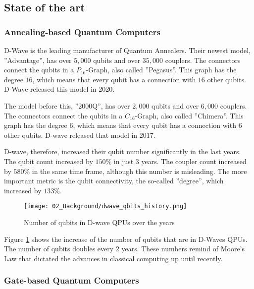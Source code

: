 


\subsection{State of the art}

\subsubsection{Annealing-based Quantum Computers}

D-Wave is the leading manufacturer of Quantum Annealers.
Their newest model, ''Advantage'', has over $5, 000$ qubits and over $35, 000$ couplers.
The connectors connect the qubits in a $P_{16}$-Graph, also called ''Pegasus''.
This graph has the degree $16$, which means that every qubit has a connection with $16$ other qubits.
D-Wave released this model in 2020.
\cite{D-Wave2020, Zbinden2020}

The model before this, ''2000Q'', has over $2, 000$ qubits and over $6, 000$ couplers.
The connectors connect the qubits in a $C_{16}$-Graph, also called ''Chimera''.
This graph has the degree $6$, which means that every qubit has a connection with $6$ other qubits.
D-wave released that model in 2017.
\cite{D-Wave2020, Zbinden2020}

D-wave, therefore, increased their qubit number significantly in the last years.
The qubit count increased by $150\%$ in just $3$ years.
The coupler count increased by $580\%$ in the same time frame, although this number is misleading.
The more important metric is the qubit connectivity, the so-called ''degree'', which increased by $133\%$.

\begin{figure}[!h]
  \centering
  \texttt{[image: 02\_Background/dwave\_qbits\_history.png]}
  \caption{Number of qubits in D-wave QPUs over the years \cite{D-Wave2018, D-Wave2020}}
  \label{figure:annealing.processors.history}
\end{figure}

Figure \ref{figure:annealing.processors.history} shows the increase of the number of qubits that are in D-Waves QPUs.
The number of qubits doubles every $2$ years.
These numbers remind of Moore's Law that dictated the advances in classical computing up until recently.
\cite{Theis2017}

\subsubsection{Gate-based Quantum Computers}

